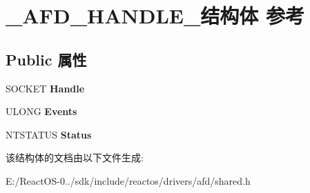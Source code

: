 \hypertarget{struct___a_f_d___h_a_n_d_l_e__}{}\section{\+\_\+\+A\+F\+D\+\_\+\+H\+A\+N\+D\+L\+E\+\_\+结构体 参考}
\label{struct___a_f_d___h_a_n_d_l_e__}
\subsection*{Public 属性}
\begin{DoxyCompactItemize}
\item 
\mbox{\label{struct___a_f_d___h_a_n_d_l_e___a50d81eb1e3af9ce9cc6318529605a4b7}} 
S\+O\+C\+K\+ET {\bfseries Handle}
\item 
\mbox{\label{struct___a_f_d___h_a_n_d_l_e___aded60da8ab39642b8df5a29ce9abf9c0}} 
U\+L\+O\+NG {\bfseries Events}
\item 
\mbox{\label{struct___a_f_d___h_a_n_d_l_e___ae7884e5eb2e986a358982b3e015d1945}} 
N\+T\+S\+T\+A\+T\+US {\bfseries Status}
\end{DoxyCompactItemize}


该结构体的文档由以下文件生成\+:\begin{DoxyCompactItemize}
\item 
E\+:/\+React\+O\+S-\/0../sdk/include/reactos/drivers/afd/shared.\+h\end{DoxyCompactItemize}
